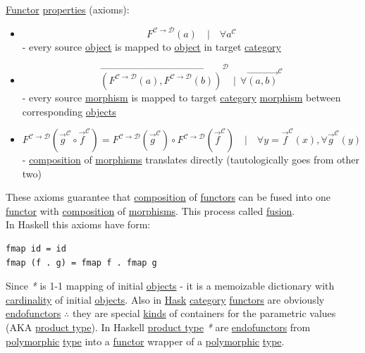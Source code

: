 \documentclass[11pt]{article}
\begin{document}
\hyperref[org6073683]{Functor} \hyperref[org763ad6b]{properties} (axioms):\\
\begin{itemize}
\item $$ F^{\mathcal{C \to D}}(a) \quad | \quad \forall a^{\mathcal{C}} $$ - every source \hyperref[org025aac8]{object} is mapped to \hyperref[org025aac8]{object} in target \hyperref[org3e3a79b]{category}\\
\item $$ \overrightarrow{(F^{\mathcal{C \to D}}(a),F^{\mathcal{C \to D}}(b))}^{\mathcal{D}} \ \ | \ \ \forall \overrightarrow{(a, b)}^{\mathcal{C}} $$ - every source \hyperref[orgad99fc6]{morphism} is mapped to target \hyperref[org3e3a79b]{category} \hyperref[orgad99fc6]{morphism} between corresponding \hyperref[orge0f000f]{objects}\\
\item $$ F^{\mathcal{C \to D}}(\overrightarrow{g}^{\mathcal{C}} \circ \overrightarrow{f}^{\mathcal{C}}) = F^{\mathcal{C \to D}}(\overrightarrow{g}^{\mathcal{C}}) \circ F^{\mathcal{C \to D}}(\overrightarrow{f}^{\mathcal{C}}) \quad | \quad \forall y=\overrightarrow{f}^{\mathcal{C}}(x), \forall \overrightarrow{g}^{\mathcal{C}}(y) $$ - \hyperref[org24a8abd]{composition} of \hyperref[org8ed0ce8]{morphisms} translates directly (tautologically goes from other two)\\
\end{itemize}

These axioms guarantee that \hyperref[org24a8abd]{composition} of \hyperref[org6c3c2a6]{functors} can be fused into one \hyperref[org6073683]{functor} with \hyperref[org24a8abd]{composition} of \hyperref[org8ed0ce8]{morphisms}. This process called \hyperref[orgc7afdd4]{fusion}.\\

In Haskell this axioms have form:\\
\begin{verbatim}
fmap id = id
fmap (f . g) = fmap f . fmap g
\end{verbatim}

Since \emph{*} is 1-1 mapping of initial \hyperref[orge0f000f]{objects} - it is a memoizable dictionary with \hyperref[orgd81825c]{cardinality} of initial \hyperref[orge0f000f]{objects}. Also in \hyperref[org79be162]{Hask} \hyperref[org3e3a79b]{category} \hyperref[org6c3c2a6]{functors} are obviously \hyperref[org1a8cedf]{endofunctors} \(\therefore\) they are special \hyperref[orgfe0ef3e]{kinds} of containers for the parametric values (AKA \hyperref[orgb3527ef]{product type}). In Haskell \hyperref[orgb3527ef]{product type} \emph{*} are \hyperref[org1a8cedf]{endofunctors} from \hyperref[org84d7fee]{polymorphic} \hyperref[org4fbaeb8]{type} into a \hyperref[org6073683]{functor} wrapper of a \hyperref[org84d7fee]{polymorphic} \hyperref[org4fbaeb8]{type}.\\
\end{document}
